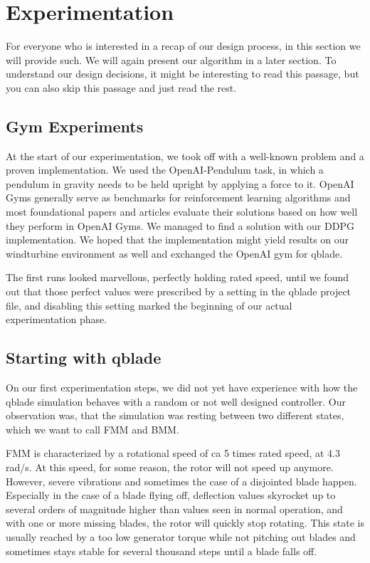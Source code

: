\documentclass[hyperref,german,beleg]{cgvpub}
\begin{document}
\chapter{Experimentation}

For everyone who is interested in a recap of our design process, in this section we will provide such. We will again present our algorithm in a later section. To understand our design decisions, it might be interesting to read this passage, but you can also skip this passage and just read the rest. 

\section{Gym Experiments}

At the start of our experimentation, we took off with a well-known problem and a proven implementation. We used the OpenAI-Pendulum task, in which a pendulum in gravity needs to be held upright by applying a force to it. OpenAI Gyms generally serve as benchmarks for reinforcement learning algorithms and most foundational papers and articles evaluate their solutions based on how well they perform in OpenAI Gyms. We managed to find a solution with our DDPG implementation. We hoped that the implementation might yield results on our windturbine environment as well and exchanged the OpenAI gym for qblade.

The first runs looked marvellous, perfectly holding rated speed, until we found out that those perfect values were prescribed by a setting in the qblade project file, and disabling this setting marked the beginning of our actual experimentation phase.

\section{Starting with qblade}

On our first experimentation steps, we did not yet have experience with how the qblade simulation behaves with a random or not well designed controller. Our observation was, that the simulation was resting between two different states, which we want to call \ac{FMM} and \ac{BMM}.

\ac{FMM} is characterized by a rotational speed of ca 5 times rated speed, at 4.3 rad/s. At this speed, for some reason, the rotor will not speed up anymore. However, severe vibrations and sometimes the case of a disjointed blade happen. Especially in the case of a blade flying off, deflection values skyrocket up to several orders of magnitude higher than values seen in normal operation, and with one or more missing blades, the rotor will quickly stop rotating. This state is usually reached by a too low generator torque while not pitching out blades and sometimes stays stable for several thousand steps until a blade falls off.
\end{document}
